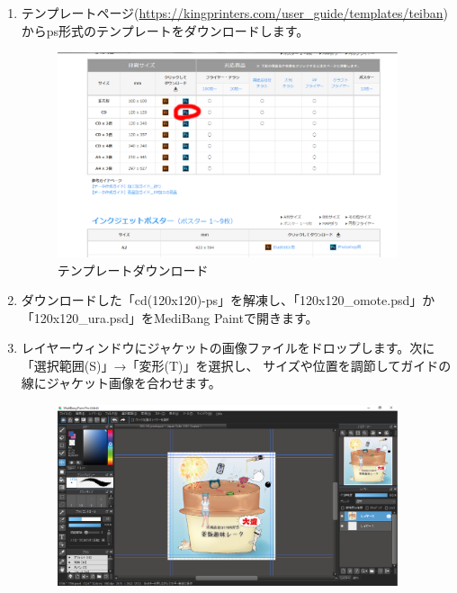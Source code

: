 \documentclass[11pt,a4paper]{jsarticle}
\begin{document}
                \begin{enumerate}
                    \item テンプレートページ(\url{https://kingprinters.com/user_guide/templates/teiban})からps形式のテンプレートをダウンロードします。
                        \begin{figure}[H]
                            \begin{center}
                            \includegraphics[width=10.0cm]{./image/kinpri02.eps}
                            \caption{テンプレートダウンロード}
                            \label{fig:kinpri02}
                            \end{center}
                        \end{figure}
                    \item ダウンロードした「cd(120x120)-ps」を解凍し、「120x120\_omote.psd」か「120x120\_ura.psd」をMediBang Paintで開きます。
                    \item レイヤーウィンドウにジャケットの画像ファイルをドロップします。次に「選択範囲(S)」→「変形(T)」を選択し、
                          サイズや位置を調節してガイドの線にジャケット画像を合わせます。
                          \begin{figure}[H]
                                \begin{center}
                                \includegraphics[width=10.0cm]{./image/kinpri03.eps}

\end{center}
\end{figure}
\end{enumerate}
\end{document}
